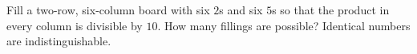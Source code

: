 Fill a two-row, six-column board with six $2$s and six $5$s so that the product in every column is divisible by $10$. How many fillings are possible? Identical numbers are indistinguishable.
